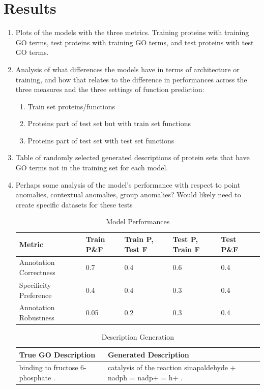 \documentclass{specification}
\begin{document}
\section{Results}
\begin{enumerate}
    \item Plots of the models with the three metrics.
Training proteins with training GO terms, test proteins with training GO terms, and test proteins with test GO terms.
    \item Analysis of what differences the models have in terms of architecture or training, and how that relates to the difference in performances across the three measures and the three settings of function prediction:
        \begin{enumerate}
            \item Train set proteins/functions
            \item Proteins part of test set but with train set functions
            \item Proteins part of test set with test set functions
        \end{enumerate}
    \item Table of randomly selected generated descriptions of protein sets that have GO terms not in the training set for each model.
    \item Perhaps some analysis of the model's performance with respect to point anomalies, contextual anomalies, group anomalies? Would likely need to create specific datasets for these tests
\begin{table}
	\caption{Model Performances}
	\centering
	\begin{tabular}{l|lllll}
		\toprule
        Metric & Train P\&F & Train P, Test F & Test P, Train F & Test P\&F \\
		\midrule
        Annotation Correctness & 0.7 & 0.4 & 0.6 & 0.4\\
        Specificity Preference & 0.4 & 0.4 & 0.3 & 0.4 \\
		Annotation Robustness & 0.05 & 0.2 & 0.3 & 0.4 \\
		\bottomrule
	\end{tabular}
	\label{tab:table}
\end{table}
\begin{table}
	\caption{Description Generation}
	\centering
    \begin{tabular}{p{7.5 cm}|p{7.5 cm}}
		\toprule
        True GO Description & Generated Description \\
		\midrule
        binding to fructose 6-phosphate . & catalysis of the reaction sinapaldehyde + nadph = nadp+ = h+ . \\ \hline

\end{tabular}
\end{table}
\end{enumerate}
\end{document}
